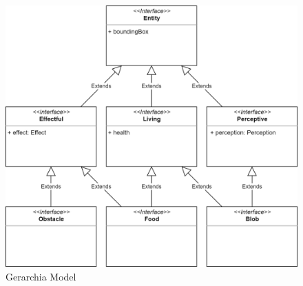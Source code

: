 \begin{figure}[h!]
\centering
\includegraphics[width=\textwidth, scale=0.44]{img/ModelHierarchy.png}
\caption{Gerarchia Model}
\label{fig:modelhierarchy}
\end{figure}